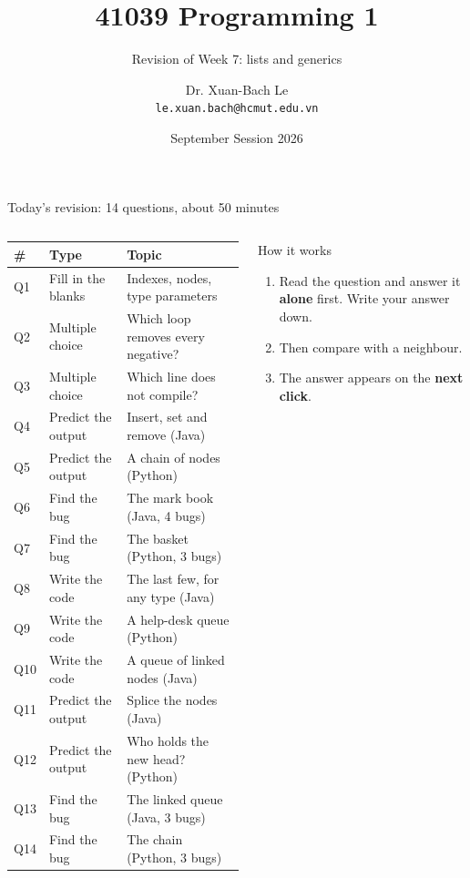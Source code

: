 \documentclass[aspectratio=169]{beamer}
\title[41039 Programming 1 --- Revision of Week 7]{41039 Programming 1}
\subtitle{Revision of Week 7: lists and generics}
\author{Dr. Xuan-Bach Le\\ \small\texttt{le.xuan.bach@hcmut.edu.vn}}
\institute{\small Faculty of Computer Science and Engineering, HCMUT}
\date{September Session 2026}
\begin{document}
\begin{frame}[plain]
  \titlepage
\end{frame}

\begin{frame}{Today's revision: 14 questions, about 50 minutes}
  \begin{columns}[T,onlytextwidth]
    {\footnotesize
    \renewcommand{\arraystretch}{1.02}
    \begin{tabular}{@{}l@{\hspace{0.8em}}l@{\hspace{0.8em}}l@{}}
      \toprule
      \textbf{\#} & \textbf{Type} & \textbf{Topic}\\
      \midrule
      Q1  & Fill in the blanks & Indexes, nodes, type parameters\\
      Q2  & Multiple choice    & Which loop removes every negative?\\
      Q3  & Multiple choice    & Which line does not compile?\\
      Q4  & Predict the output & Insert, set and remove (Java)\\
      Q5  & Predict the output & A chain of nodes (Python)\\
      Q6  & Find the bug       & The mark book (Java, 4 bugs)\\
      Q7  & Find the bug       & The basket (Python, 3 bugs)\\
      Q8  & Write the code     & The last few, for any type (Java)\\
      Q9  & Write the code     & A help-desk queue (Python)\\
      Q10 & Write the code     & A queue of linked nodes (Java)\\
      \midrule
      Q11 & Predict the output & Splice the nodes (Java)\\
      Q12 & Predict the output & Who holds the new head? (Python)\\
      Q13 & Find the bug       & The linked queue (Java, 3 bugs)\\
      Q14 & Find the bug       & The chain (Python, 3 bugs)\\
      \bottomrule
    \end{tabular}}
    \begin{discussionbox}{How it works}
      \small\raggedright
      \begin{enumerate}[itemsep=0.3em, topsep=0.1em, leftmargin=1.2em]
        \item Read the question and answer it \textbf{alone} first. Write your answer
              down.
        \item Then compare with a neighbour.
        \item The answer appears on the \textbf{next click}.
      \end{enumerate}
    \end{discussionbox}
  \end{columns}
\end{frame}
\end{document}

